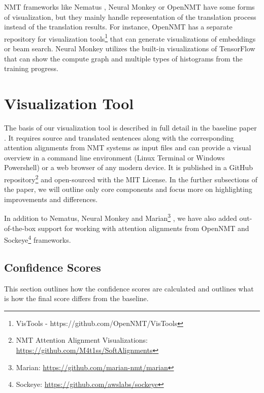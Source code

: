 \documentclass[runningheads,a4paper]{lncs/llncs}
\begin{document}
NMT frameworks like Nematus \cite{sennrich2017nematus}, Neural Monkey \cite{NeuralMonkey:2017} or OpenNMT \cite{2017opennmt} have some forms of visualization, but they mainly handle representation of the translation process instead of the translation results. For instance, OpenNMT has a separate repository for visualization tools\footnote{VisTools - https://github.com/OpenNMT/VisTools} that can generate visualizations of embeddings or beam search. Neural Monkey utilizes the built-in visualizations of TensorFlow \cite{abadi2016tensorflow} that can show the compute graph and multiple types of histograms from the training progress.

\section{Visualization Tool}
\label{sec:tool}

The basis of our visualization tool is described in full detail in the baseline paper \cite{rikters2017visualizing}. It requires source and translated sentences along with the corresponding attention alignments  from NMT systems as input files and can provide a visual overview in a command line environment (Linux Terminal or Windows Powershell) or a web browser of any modern device. It is published in a
GitHub repository\footnote{NMT Attention Alignment Visualizations: \url{https://github.com/M4t1ss/SoftAlignments}} 
and open-sourced with the MIT License. In the further subsections of the paper, we will outline only core components and focus more on highlighting improvements and differences.

In addition to Nematus, Neural Monkey and Marian\footnote{Marian: \url{https://github.com/marian-nmt/marian}}  \cite{junczys2018marian}, we have also added out-of-the-box support for working with attention alignments from OpenNMT and Sockeye\footnote{Sockeye: \url{https://github.com/awslabs/sockeye}} \cite{Sockeye:17} frameworks.

\subsection{Confidence Scores}
\label{sec:scores}

This section outlines how the confidence scores are calculated and outlines what is how the final score differs from the baseline.

\def\CP{{\rm CP}}
\def\CDP{{\rm CDP}}
\def\AP{{\rm AP}}
\def\OP{{\rm OP}}
\end{document}
